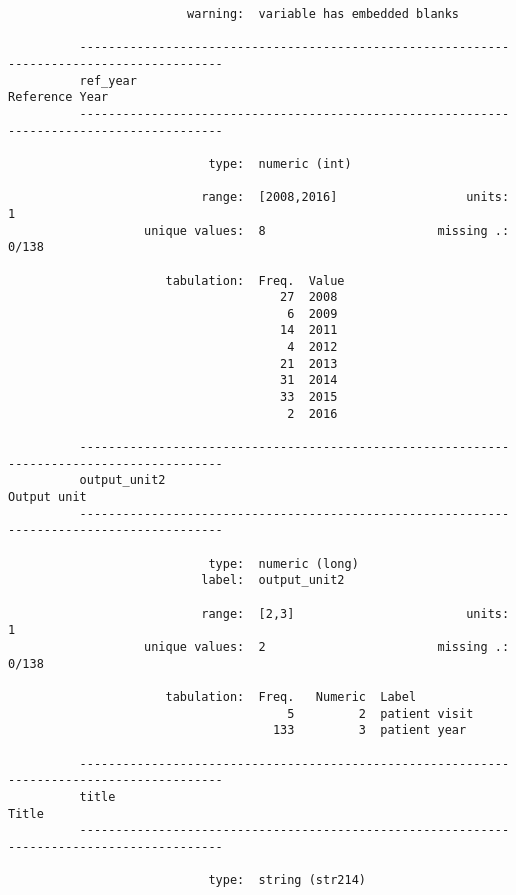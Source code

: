 \documentclass{article}
\begin{document}
\begin{verbatim}
                         warning:  variable has embedded blanks
          
          ------------------------------------------------------------------------------------------
          ref_year                                                                    Reference Year
          ------------------------------------------------------------------------------------------
          
                            type:  numeric (int)
          
                           range:  [2008,2016]                  units:  1
                   unique values:  8                        missing .:  0/138
          
                      tabulation:  Freq.  Value
                                      27  2008
                                       6  2009
                                      14  2011
                                       4  2012
                                      21  2013
                                      31  2014
                                      33  2015
                                       2  2016
          
          ------------------------------------------------------------------------------------------
          output_unit2                                                                   Output unit
          ------------------------------------------------------------------------------------------
          
                            type:  numeric (long)
                           label:  output_unit2
          
                           range:  [2,3]                        units:  1
                   unique values:  2                        missing .:  0/138
          
                      tabulation:  Freq.   Numeric  Label
                                       5         2  patient visit
                                     133         3  patient year
          
          ------------------------------------------------------------------------------------------
          title                                                                                Title
          ------------------------------------------------------------------------------------------
          
                            type:  string (str214)
          

\end{verbatim}
\end{document}
